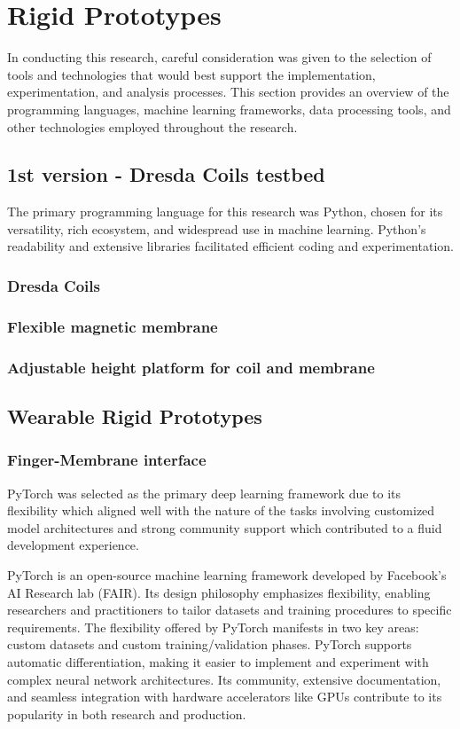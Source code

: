 \section{Rigid Prototypes}
In conducting this research, careful consideration was given to the selection of tools and technologies that would best support the implementation, experimentation, and analysis processes. This section provides an overview of the programming languages, machine learning frameworks, data processing tools, and other technologies employed throughout the research.

\subsection{1st version - Dresda Coils testbed}
The primary programming language for this research was Python, chosen for its versatility, rich ecosystem, and widespread use in machine learning. Python's readability and extensive libraries facilitated efficient coding and experimentation.

\subsubsection{Dresda Coils}
\subsubsection{Flexible magnetic membrane}
\subsubsection{Adjustable height platform for coil and membrane}

\subsection{Wearable Rigid Prototypes}

\subsubsection{Finger-Membrane interface}
PyTorch \cite{PyTorch} was selected as the primary deep learning framework due to its flexibility which aligned well with the nature of the tasks involving customized model architectures and strong community support which contributed to a fluid development experience.

PyTorch is an open-source machine learning framework developed by Facebook's AI Research lab (FAIR). Its design philosophy emphasizes flexibility, enabling researchers and practitioners to tailor datasets and training procedures to specific requirements. The flexibility offered by PyTorch manifests in two key areas: custom datasets and custom training/validation phases. PyTorch supports automatic differentiation, making it easier to implement and experiment with complex neural network architectures. Its community, extensive documentation, and seamless integration with hardware accelerators like GPUs contribute to its popularity in both research and production.

